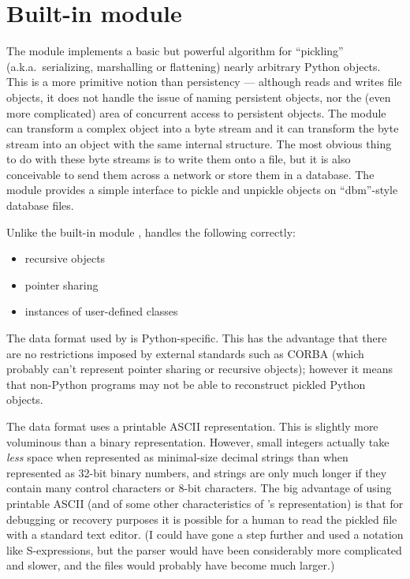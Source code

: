 \section{Built-in module }

The  module implements a basic but powerful algorithm for
``pickling'' (a.k.a.\ serializing, marshalling or flattening) nearly
arbitrary Python objects.  This is a more primitive notion than
persistency --- although  reads and writes file objects,
it does not handle the issue of naming persistent objects, nor the
(even more complicated) area of concurrent access to persistent
objects.  The  module can transform a complex object into
a byte stream and it can transform the byte stream into an object with
the same internal structure.  The most obvious thing to do with these
byte streams is to write them onto a file, but it is also conceivable
to send them across a network or store them in a database.  The module
 provides a simple interface to pickle and unpickle
objects on ``dbm''-style database files.

Unlike the built-in module ,  handles the
following correctly:

\begin{itemize}

\item recursive objects

\item pointer sharing

\item instances of user-defined classes

\end{itemize}

The data format used by  is Python-specific.  This has
the advantage that there are no restrictions imposed by external
standards such as CORBA (which probably can't represent pointer
sharing or recursive objects); however it means that non-Python
programs may not be able to reconstruct pickled Python objects.

The  data format uses a printable ASCII representation.
This is slightly more voluminous than a binary representation.
However, small integers actually take {\em less} space when
represented as minimal-size decimal strings than when represented as
32-bit binary numbers, and strings are only much longer if they
contain many control characters or 8-bit characters.  The big
advantage of using printable ASCII (and of some other characteristics
of 's representation) is that for debugging or recovery
purposes it is possible for a human to read the pickled file with a
standard text editor.  (I could have gone a step further and used a
notation like S-expressions, but the parser would have been
considerably more complicated and slower, and the files would probably
have become much larger.)

